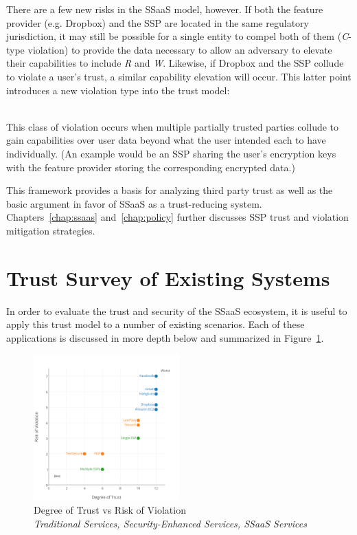 There are a few new risks in the SSaaS model, however. If both the
feature provider (e.g. Dropbox) and the SSP are located in the same
regulatory jurisdiction, it may still be possible for a single entity
to compel both of them (\emph{C}-type violation) to provide the data
necessary to allow an adversary to elevate their capabilities to
include \emph{R} and \emph{W}. Likewise, if Dropbox and the SSP
collude to violate a user's trust, a similar capability elevation will
occur. This latter point introduces a new violation type into the
trust model:

\begin{packed_desc}
\item[Colluding (L):] \hfill \\ This class of violation occurs when
  multiple partially trusted parties collude to gain capabilities over
  user data beyond what the user intended each to have
  individually. (An example would be an SSP sharing the user's
  encryption keys with the feature provider storing the corresponding
  encrypted data.)
\end{packed_desc}

This framework provides a basis for analyzing third party trust as
well as the basic argument in favor of SSaaS as a trust-reducing
system. Chapters~\ref{chap:ssaas} and~\ref{chap:policy} further
discusses SSP trust and violation mitigation strategies.

\section{Trust Survey of Existing Systems}
\label{chap:trust:survey}

In order to evaluate the trust and security of the SSaaS ecosystem, it
is useful to apply this trust model to a number of existing
scenarios. Each of these applications is discussed in more depth below
and summarized in Figure~\ref{fig:trust:degvrisk}.

\begin{figure}[!t]
  \centering
  \includegraphics[width=0.5\textwidth]{./figs/pre/Trust-Chart-DegreeRisk-Traditional_Security_SSaaS.png}
  \caption{Degree of Trust vs Risk of Violation\\
    \textit{
      {\color{blue}Traditional Services},
      {\color{orange}Security-Enhanced Services},
      {\color{ForestGreen}SSaaS Services}}}
  \label{fig:trust:degvrisk}
\end{figure}

